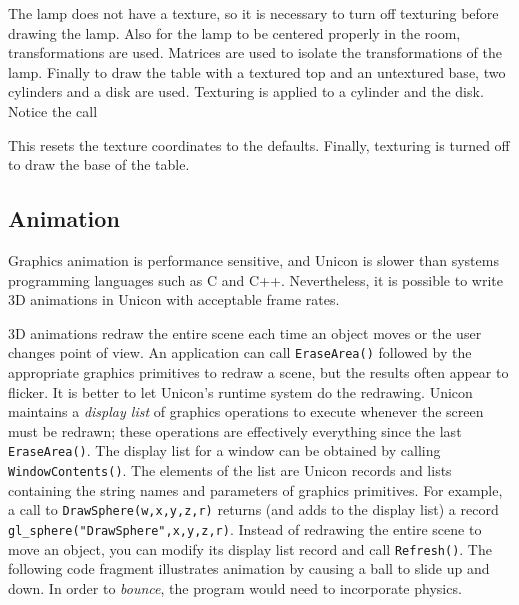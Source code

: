 The lamp does not have a texture, so it is necessary to turn off
texturing before drawing the lamp. Also for the lamp to be centered
properly in the room, transformations are used. Matrices are used to
isolate the transformations of the lamp. Finally to draw the table
with a textured top and an untextured base, two cylinders and a disk
are used. Texturing is applied to a cylinder and the disk.  Notice the
call


\noindent
This resets the texture coordinates to the defaults. Finally, texturing
is turned off to draw the base of the table.

\subsection*{Animation}

Graphics animation is performance sensitive, and Unicon is slower than
systems programming languages such as C and C++. Nevertheless, it is
possible to write 3D animations in Unicon with acceptable frame rates.

3D animations redraw the entire scene each time an object moves or the
user changes point of view. An application can call
\texttt{EraseArea()} followed by the appropriate graphics primitives
to redraw a scene, but the results often appear to flicker. It is
better to let Unicon's runtime system do the redrawing. Unicon
maintains a \textit{display list} of graphics operations to execute
whenever the screen must be redrawn; these operations are effectively
everything since the last \texttt{EraseArea()}. The display list for a
window can be obtained by calling \texttt{WindowContents()}. The
elements of the list are Unicon records and lists containing the
string names and parameters of graphics primitives. For example, a
call to \texttt{DrawSphere(w,x,y,z,r)} returns (and adds to the
display list) a record \texttt{gl\_sphere("DrawSphere",x,y,z,r)}.
Instead of redrawing the entire scene to move an object, you can
modify its display list record and call \texttt{Refresh()}. The
following code fragment illustrates animation by causing a ball to
slide up and down.  In order to \textit{bounce}, the program would
need to incorporate physics.


